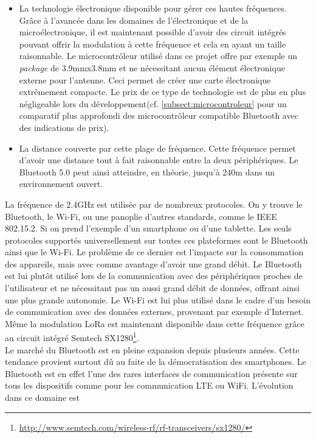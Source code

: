 \begin{itemize}
    \item La technologie électronique disponible pour gérer ces hautes fréquences. Grâce à l'avancée dans les domaines de l'électronique et de la microélectronique, il est maintenant possible d'avoir des circuit intégrés pouvant offrir la modulation à cette fréquence et cela en ayant un taille raisonnable. Le microcontrôleur utilisé dans ce projet offre par exemple un \textit{package} de 3.9mmx3.8mm et ne nécessitant aucun élément électronique externe pour l'antenne. Ceci permet de créer une carte électronique extrêmement compacte. Le prix de ce type de technologie est de plus en plus négligeable lors du développement(cf. \autoref{subsect:microcontroleur} pour un comparatif plus approfondi des microcontrôleur compatible Bluetooth avec des indications de prix).
    
    \item La distance couverte par cette plage de fréquence. Cette fréquence permet d'avoir une distance tout à fait raisonnable entre la deux périphériques. Le Bluetooth 5.0 peut ainsi atteindre, en théorie, jusqu'à 240m dans un environnement ouvert. 


    
\end{itemize}

La fréquence de 2.4GHz est utilisée par de nombreux protocoles. On y trouve le Bluetooth, le Wi-Fi, 
ou une panoplie d'autres standards, comme le IEEE 802.15.2. Si on prend l'exemple d'un smartphone ou d'une tablette. Les seuls protocoles supportés universellement sur toutes ces plateformes sont le Bluetooth ainsi que le Wi-Fi. Le problème de ce dernier est l'impacte sur la consommation des appareils, mais avec comme avantage d'avoir une grand débit. Le Bluetooth est lui plutôt utilisé lors de la communication avec des périphériques proches de l'utilisateur et ne nécessitant pas un aussi grand débit de données, offrant ainsi une plus grande autonomie. Le Wi-Fi est lui plus utilisé dans le cadre d'un besoin de communication avec des données externes, provenant par exemple d'Internet.\\

Même la modulation LoRa est maintenant disponible dans cette fréquence grâce au circuit intégré Semtech SX1280\footnote{\url{http://www.semtech.com/wireless-rf/rf-transceivers/sx1280/}}. \\

Le marché du Bluetooth est en pleine expansion depuis plusieurs années. Cette tendance provient surtout dû au faite de la démocratisation des smartphones. Le Bluetooth est en effet l'une des rares interfaces de communication présente sur tous les dispositifs comme pour les communication LTE ou WiFi. L'évolution dans ce domaine est 


